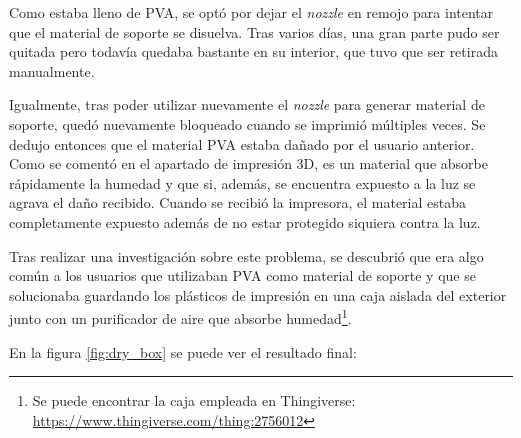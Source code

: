 Como estaba lleno de \ac{PVA}, se optó por dejar el \textit{nozzle} en remojo para
intentar que el material de soporte se disuelva. Tras varios días, una gran parte
pudo ser quitada pero todavía quedaba bastante en su interior, que tuvo que ser
retirada manualmente.

Igualmente, tras poder utilizar nuevamente el \textit{nozzle} para generar material
de soporte, quedó nuevamente bloqueado cuando se imprimió múltiples veces. Se dedujo
entonces que el material \ac{PVA} estaba dañado por el usuario anterior. Como se
comentó en el apartado de impresión 3D, es un material que absorbe rápidamente la
humedad y que si, además, se encuentra expuesto a la luz se agrava el daño recibido.
Cuando se recibió la impresora, el material estaba completamente expuesto además de 
no estar protegido siquiera contra la luz.

Tras realizar una investigación sobre este problema, se descubrió que era algo
común a los usuarios que utilizaban \ac{PVA} como material de soporte y que se
solucionaba guardando los plásticos de impresión en una caja aislada del exterior
junto con un purificador de aire que absorbe humedad\footnote{Se puede encontrar
la caja empleada en Thingiverse: \url{https://www.thingiverse.com/thing:2756012}}.

En la figura \ref{fig:dry_box} se puede ver el resultado final:


